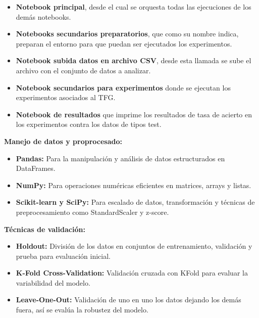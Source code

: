   \begin{itemize}
  \tightlist
  \item
   \textbf{Notebook principal}, desde el cual se orquesta todas las ejecuciones de los demás notebooks.
  \item
   \textbf{Notebooks secundarios preparatorios}, que como su nombre indica, preparan el entorno para que puedan ser ejecutados los experimentos.
  \item
   \textbf{Notebook subida datos en archivo CSV}, desde esta llamada se sube el archivo con el conjunto de datos a analizar.
  \item
   \textbf{Notebook secundarios para experimentos} donde se ejecutan los experimentos asociados al TFG.
  \item
   \textbf{Notebook de resultados} que imprime los resultados de tasa de acierto en los experimentos contra los datos de tipos test.
  \end{itemize}
 
 
 
  

  \textbf{Manejo de datos y proprocesado:}

  \begin{itemize}
  \tightlist
  \item
   \textbf{Pandas:} Para la manipulación y análisis de datos estructurados en DataFrames.
  \item
   \textbf{NumPy:} Para operaciones numéricas eficientes en matrices, arrays y listas.
  \item
   \textbf{Scikit-learn y SciPy:} Para escalado de datos, transformación y técnicas de preprocesamiento como StandardScaler y z-score.
  \end{itemize}

  \textbf{Técnicas de validación:}

  \begin{itemize}
  \tightlist
  \item
   \textbf{Holdout:} División de los datos en conjuntos de entrenamiento, validación y prueba para evaluación inicial.
  \item
   \textbf{K-Fold Cross-Validation:} Validación cruzada con KFold para evaluar la variabilidad del modelo.
  \item
   \textbf{Leave-One-Out:} Validación de uno en uno los datos dejando los demás fuera, así se evalúa la robustez del modelo. 
  \end{itemize} 
  
